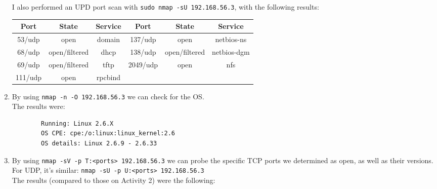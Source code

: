 \begin{enumerate}
    I also performed an UPD port scan with \texttt{sudo nmap -sU 192.168.56.3}, with the following results:
    \begin{table}[!h]
        \centering
        \begin{tabular}{|c|c|c||c|c|c|}
            \hline
            \textbf{Port} & \textbf{State} & \textbf{Service} & \textbf{Port} & \textbf{State} & \textbf{Service} \\ \hline
            53/udp        & open           & domain           & 137/udp       & open           & netbios-ns       \\ \hline
            68/udp        & open/filtered  & dhcp             & 138/udp       & open/filtered  & netbios-dgm      \\ \hline
            69/udp        & open/filtered  & tftp             & 2049/udp      & open           & nfs              \\ \hline
            111/udp       & open           & rpcbind          &               &                &                  \\ \hline
        \end{tabular}
    \end{table}
    

    \item By using \texttt{nmap -n -O 192.168.56.3} we can check for the OS.\\
    The results were:
    \begin{verbatim}
        Running: Linux 2.6.X
        OS CPE: cpe:/o:linux:linux_kernel:2.6
        OS details: Linux 2.6.9 - 2.6.33
    \end{verbatim}
    

    \item By using \texttt{nmap -sV -p T:<ports> 192.168.56.3} we can probe the specific TCP ports we determined as open, as well as their versions. For UDP, it's similar: \texttt{nmap -sU -p U:<ports> 192.168.56.3}\\
    The results (compared to those on Activity 2) were the following:\newline


\end{enumerate}
